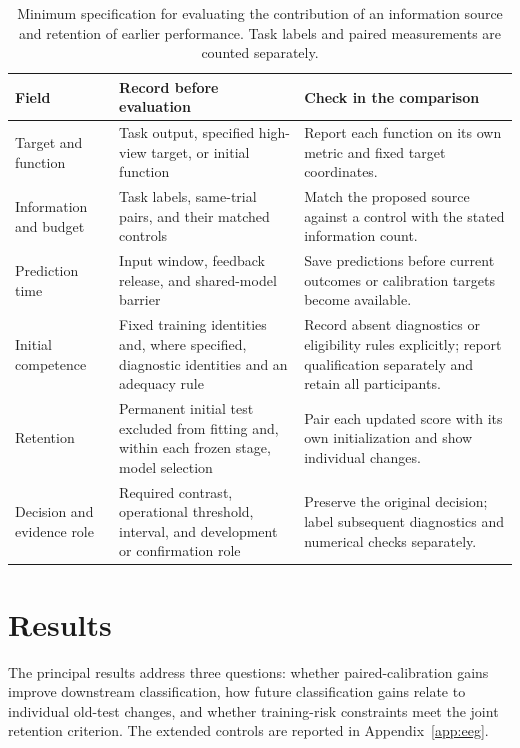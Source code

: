 \documentclass[11pt,a4paper]{article}
\begin{document}
\begin{table}[tbp]
\centering\small
\caption{Minimum specification for evaluating the contribution of an information source and retention of earlier performance. Task labels and paired measurements are counted separately.}
\label{tab:evaluation-specification}
\begin{tabularx}{\linewidth}{@{}>{\raggedright\arraybackslash}p{.20\linewidth}>{\raggedright\arraybackslash}X>{\raggedright\arraybackslash}X@{}}
\toprule
Field & Record before evaluation & Check in the comparison\\
\midrule
Target and function & Task output, specified high-view target, or initial function & Report each function on its own metric and fixed target coordinates.\\
\addlinespace
Information and budget & Task labels, same-trial pairs, and their matched controls & Match the proposed source against a control with the stated information count.\\
\addlinespace
Prediction time & Input window, feedback release, and shared-model barrier & Save predictions before current outcomes or calibration targets become available.\\
\addlinespace
Initial competence & Fixed training identities and, where specified, diagnostic identities and an adequacy rule & Record absent diagnostics or eligibility rules explicitly; report qualification separately and retain all participants.\\
\addlinespace
Retention & Permanent initial test excluded from fitting and, within each frozen stage, model selection & Pair each updated score with its own initialization and show individual changes.\\
\addlinespace
Decision and evidence role & Required contrast, operational threshold, interval, and development or confirmation role & Preserve the original decision; label subsequent diagnostics and numerical checks separately.\\
\bottomrule
\end{tabularx}
\end{table}


\section{Results}

The principal results address three questions: whether paired-calibration gains improve downstream classification, how future classification gains relate to individual old-test changes, and whether training-risk constraints meet the joint retention criterion. The extended controls are reported in Appendix~\ref{app:eeg}.
\end{document}
